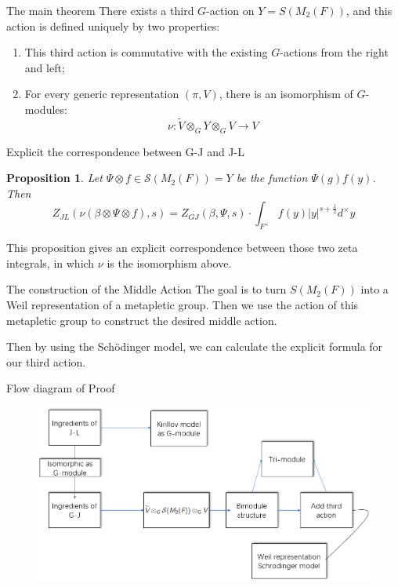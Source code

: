 \documentclass[aspectratio=169]{beamer}
\theoremstyle{plain}
\newtheorem{prop}[thm]{Proposition}
\theoremstyle{definition}
\theoremstyle{remark}
\begin{document}
\begin{frame}{The main theorem}
    There exists a third $G$-action on $Y=S(M_{2}(F))$, and this action is defined uniquely by two properties:
\begin{enumerate}
    \item This third action is commutative with the existing $G$-actions from the right and left;
    \item For every generic representation $(\pi, V)$, there is an isomorphism of $G$-modules:
    \begin{equation*}
        \nu:\widetilde{V}\otimes_{G}Y\otimes_{G}V\rightarrow V
    \end{equation*}
    \end{enumerate}
\end{frame}
\begin{frame}{Explicit the correspondence between G-J and J-L}

\begin{prop}
    Let $\Psi\otimes f\in \mathcal{S}(M_{2}(F))=Y$ be the function $\Psi(g)f(y)$. Then 
    \begin{equation*}
        Z_{JL}(\nu(\beta\otimes \Psi\otimes f),s)=Z_{GJ}(\beta,\Psi,s)\cdot \int_{F^{\times}}f(y)|y|^{s+\frac{1}{2}}d^{\times}y
    \end{equation*}
\end{prop}
This proposition gives an explicit correspondence between those two zeta integrals, in which $\nu$ is the isomorphism  above.
\end{frame}



\begin{frame}{The construction of the Middle Action}
The goal is to turn $S(M_{2}(F))$ into a Weil representation of a metapletic group. Then we use the action of this metapletic group to construct the desired middle action.  

\vspace{0.5 cm}


Then by using the Sch\"odinger model, we can calculate the explicit formula for our third action.
\end{frame}
\begin{frame}{Flow diagram of Proof}
    \begin{center}
        \begin{figure} \includegraphics[scale=0.5]{proof.png}
            \label{png.proof}
        \end{figure}
    \end{center}
\end{frame}
\end{document}
